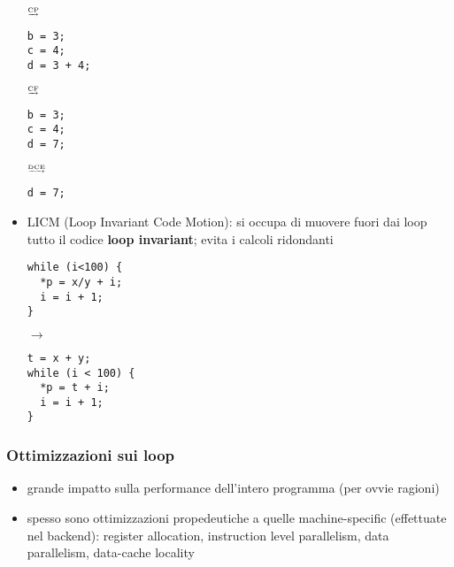 \begin{itemize}
  \hfill $\tiny\underrightarrow{\text{CP}}$ \hfill
  \begin{minipage}[c]{.25\textwidth}
  \begin{lstlisting}
b = 3;
c = 4;
d = 3 + 4;\end{lstlisting}
  \end{minipage}
  \hfill $\tiny\underrightarrow{\text{CF}}$ \hfill
  \begin{minipage}[c]{.25\textwidth}
  \begin{lstlisting}
b = 3;
c = 4;
d = 7;\end{lstlisting}
  \end{minipage}
  \hfill $\tiny\underrightarrow{\text{DCE}}$ \hfill
  \begin{minipage}[c]{.25\textwidth}
  \begin{lstlisting}
d = 7;\end{lstlisting}
  \end{minipage}
\item LICM (Loop Invariant Code Motion): si occupa di muovere fuori dai loop tutto il codice \textbf{loop invariant}; evita i calcoli ridondanti\\
  \begin{minipage}[c]{.4\textwidth}
  \begin{lstlisting}
while (i<100) {
  *p = x/y + i;
  i = i + 1;
}\end{lstlisting}
  \end{minipage}
  \hfill $\rightarrow$ \hfill
  \begin{minipage}[c]{.4\textwidth}
  \begin{lstlisting}
t = x + y;
while (i < 100) {
  *p = t + i;
  i = i + 1;
}\end{lstlisting}
  \end{minipage}
\end{itemize}

\subsubsection{Ottimizzazioni sui loop}

\begin{itemize}
  \item grande impatto sulla performance dell'intero programma (per ovvie ragioni)
  \item spesso sono ottimizzazioni propedeutiche a quelle machine-specific (effettuate nel backend): register allocation, instruction level parallelism, data parallelism, data-cache locality
\end{itemize}

